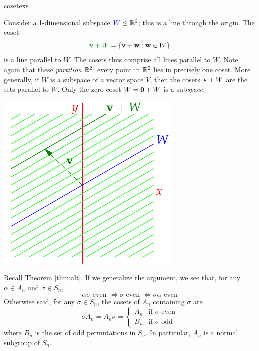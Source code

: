 \begin{examples}{}{cosetexs}
\begin{enumerate}
	  
		\begin{minipage}[t]{0.62\linewidth}\vspace{0pt}
			\item Consider a 1-dimensional subspace $\textcolor{blue}{W}\le\mathbb{R}^2$; this is a line through the origin. The coset
			\[
				\textcolor{Green}{\vv+W}=\{\vv+\vw:\vw\in W\}
			\]
			is a line parallel to $W$. The cosets thus comprise all lines parallel to $W$. Note again that these \emph{partition} $\mathbb{R}^2$: every point in $\mathbb{R}^2$ lies in precisely one coset.\smallbreak
			More generally, if $W$ is a subspace of a vector space $V$, then the cosets ${\mathbf{v}}+ W$ are the sets parallel to $W$. Only the zero coset $W=\mathbf{0}+W$ is a sub\emph{space.}
		\end{minipage}
		\hfill
		\begin{minipage}[t]{0.36\linewidth}\vspace{0pt}
			\flushright\includegraphics[scale=0.93]{coset-coset}
		\end{minipage}
	
	
		\item Recall Theorem \ref{thm:alt}. If we generalize the argument, we see that, for any $\alpha\in A_n$ and $\sigma\in S_n$,
		\[
			\alpha\sigma\text{ even }
			\iff \sigma\text{ even }
			\iff \sigma\alpha\text{ even}
		\]
		Otherwise said, for any $\sigma\in S_n$, the cosets of $A_n$ containing $\sigma$ are
		\[
			\sigma A_n=A_n\sigma=
			\begin{cases}
				A_n&\text{if $\sigma$ even}\\
				B_n&\text{if $\sigma$ odd}
			\end{cases}
		\]
		where $B_n$ is the set of odd permutations in $S_n$. In particular, $A_n$ is a normal subgroup of $S_n$.
	\end{enumerate}
\end{examples}

